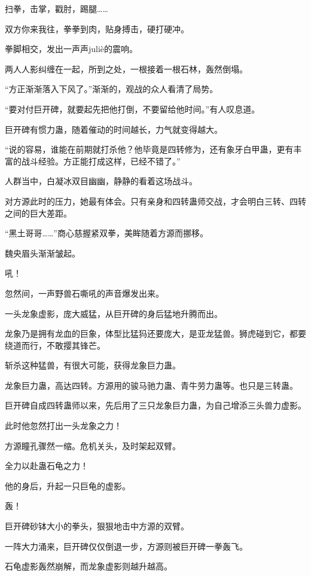 
\begin{this_body}

扫拳，击掌，戳肘，踢腿……

双方你来我往，拳拳到肉，贴身搏击，硬打硬冲。

拳脚相交，发出一声声juliè的震响。

两人人影纠缠在一起，所到之处，一根接着一根石林，轰然倒塌。

“方正渐渐落入下风了。”渐渐的，观战的众人看清了局势。

“要对付巨开碑，就要起先把他打倒，不要留给他时间。”有人叹息道。

巨开碑有惯力蛊，随着催动的时间越长，力气就变得越大。

“说的容易，谁能在前期就打杀他？他毕竟是四转修为，还有象牙白甲蛊，更有丰富的战斗经验。方正能打成这样，已经不错了。”

人群当中，白凝冰双目幽幽，静静的看着这场战斗。

对方源此时的压力，她最有体会。只有亲身和四转蛊师交战，才会明白三转、四转之间的巨大差距。

“黑土哥哥……”商心慈握紧双拳，美眸随着方源而挪移。

魏央眉头渐渐皱起。

吼！

忽然间，一声野兽石嘶吼的声音爆发出来。

一头龙象虚影，庞大威猛，从巨开碑的身后猛地升腾而出。

龙象乃是拥有龙血的巨象，体型比猛犸还要庞大，是亚龙猛兽。狮虎碰到它，都要绕道而行，不敢撄其锋芒。

斩杀这种猛兽，有很大可能，获得龙象巨力蛊。

龙象巨力蛊，高达四转。方源用的骏马驰力蛊、青牛劳力蛊等。也只是三转蛊。

巨开碑自成四转蛊师以来，先后用了三只龙象巨力蛊，为自己增添三头兽力虚影。

此时他忽然打出一头龙象之力！

方源瞳孔骤然一缩。危机关头，及时架起双臂。

全力以赴蛊石龟之力！

他的身后，升起一只巨龟的虚影。

轰！

巨开碑砂钵大小的拳头，狠狠地击中方源的双臂。

一阵大力涌来，巨开碑仅仅倒退一步，方源则被巨开碑一拳轰飞。

石龟虚影轰然崩解，而龙象虚影则越升越高。


\end{this_body}
